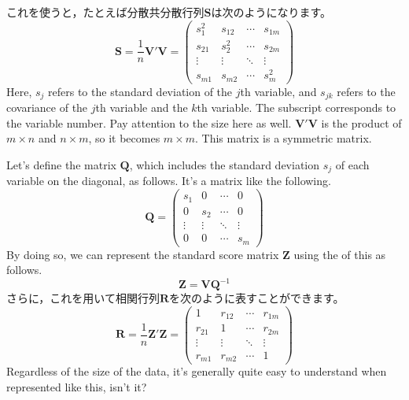 \documentclass{ltjsbook}
\begin{document}
これを使うと，たとえば分散共分散行列$\bm{S}$は次のようになります。
\[ \bm{S} = \frac{1}{n} \bm{V}' \bm{V} = \begin{pmatrix}
		s_1^2  & s_{12} & \cdots & s_{1m} \\
		s_{21} & s_2^2  & \cdots & s_{2m} \\
		\vdots & \vdots & \ddots & \vdots \\
		s_{m1} & s_{m2} & \cdots & s_m^2\end{pmatrix} \]
Here, $s_j$ refers to the standard deviation of the $j$th variable, and $s_{jk}$ refers to the covariance of the $j$th variable and the $k$th variable. The subscript corresponds to the variable number.
Pay attention to the size here as well. $\bm{V}'\bm{V}$ is the product of $m \times n$ and $n \times m$, so it becomes $m \times m$. This matrix is a symmetric matrix.

Let's define the matrix $\bm{Q}$, which includes the standard deviation $s_j$ of each variable on the diagonal, as follows. It's a matrix like the following.
\[ \bm{Q} = \begin{pmatrix} s_1    & 0      & \cdots & 0      \\
                0      & s_2    & \cdots & 0      \\
                \vdots & \vdots & \ddots & \vdots \\
                0      & 0      & \cdots & s_m\end{pmatrix} \]
By doing so, we can represent the standard score matrix $\bm{Z}$ using the  of this as follows.
\[ \bm{Z} = \bm{V} \bm{Q}^{-1} \]
さらに，これを用いて相関行列$\bm{R}$を次のように表すことができます。
\[ \bm{R} = \frac{1}{n}\bm{Z}' \bm{Z} = \begin{pmatrix} 1      & r_{12} & \cdots & r_{1m} \\
                r_{21} & 1      & \cdots & r_{2m} \\
                \vdots & \vdots & \ddots & \vdots \\
                r_{m1} & r_{m2} & \cdots & 1\end{pmatrix} \]
Regardless of the size of the data, it's generally quite easy to understand when represented like this, isn't it?
\end{document}
